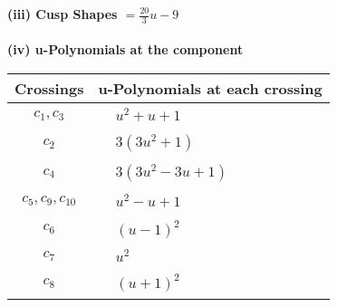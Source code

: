 \documentclass[1p]{elsarticle_modified}
\theoremstyle{definition}
\begin{document}
\flushleft \textbf{(iii) Cusp Shapes $= \frac{20}{3} u-9$}\\~\\
\newpage\renewcommand{\arraystretch}{1}
\flushleft \textbf{(iv) u-Polynomials at the component}\newline \\
\begin{tabular}{m{50pt}|m{274pt}}
Crossings & \hspace{64pt}u-Polynomials at each crossing \\
\hline $$\begin{aligned}c_{1},c_{3}\end{aligned}$$&$\begin{aligned}
&u^2+u+1
\end{aligned}$\\
\hline $$\begin{aligned}c_{2}\end{aligned}$$&$\begin{aligned}
&3(3 u^2+1)
\end{aligned}$\\
\hline $$\begin{aligned}c_{4}\end{aligned}$$&$\begin{aligned}
&3(3 u^2-3 u+1)
\end{aligned}$\\
\hline $$\begin{aligned}c_{5},c_{9},c_{10}\end{aligned}$$&$\begin{aligned}
&u^2- u+1
\end{aligned}$\\
\hline $$\begin{aligned}c_{6}\end{aligned}$$&$\begin{aligned}
&(u-1)^2
\end{aligned}$\\
\hline $$\begin{aligned}c_{7}\end{aligned}$$&$\begin{aligned}
&u^2
\end{aligned}$\\
\hline $$\begin{aligned}c_{8}\end{aligned}$$&$\begin{aligned}
&(u+1)^2
\end{aligned}$\\
\hline
\end{tabular}\\~\\
\end{document}
